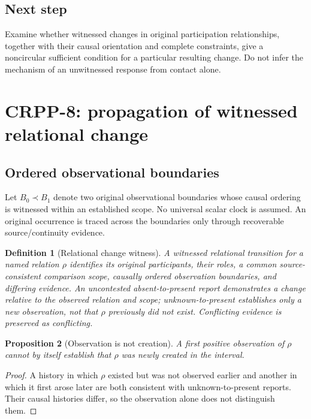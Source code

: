 \documentclass[11pt]{article}
\newtheorem{definition}{Definition}[section]
\newtheorem{proposition}[definition]{Proposition}
\begin{document}
\subsection{Next step}
Examine whether witnessed changes in original participation
relationships, together with their causal orientation and
complete constraints, give a noncircular sufficient condition
for a particular resulting change. Do not infer the
mechanism of an unwitnessed response from contact alone.


\section{CRPP-8: propagation of witnessed relational change}
\label{sec:crpp8}

\subsection{Ordered observational boundaries}
Let $B_0\prec B_1$ denote two original observational
boundaries whose causal ordering is witnessed within an
established scope. No universal scalar clock is assumed.
An original occurrence is traced across the boundaries
only through recoverable source/continuity evidence.

\begin{definition}[Relational change witness]
A witnessed relational transition for a named relation
$\rho$ identifies its original participants, their roles,
a common source-consistent comparison scope, causally
ordered observation boundaries, and differing evidence.
An uncontested absent-to-present report demonstrates
a change relative to the observed relation and scope;
unknown-to-present establishes only a new observation,
not that $\rho$ previously did not exist.
Conflicting evidence is preserved as conflicting.
\end{definition}

\begin{proposition}[Observation is not creation]
A first positive observation of $\rho$ cannot by itself
establish that $\rho$ was newly created in the interval.
\end{proposition}
\begin{proof}
A history in which $\rho$ existed but was not observed
earlier and another in which it first arose later are
both consistent with unknown-to-present reports.
Their causal histories differ, so the observation alone
does not distinguish them.
\end{proof}
\end{document}
